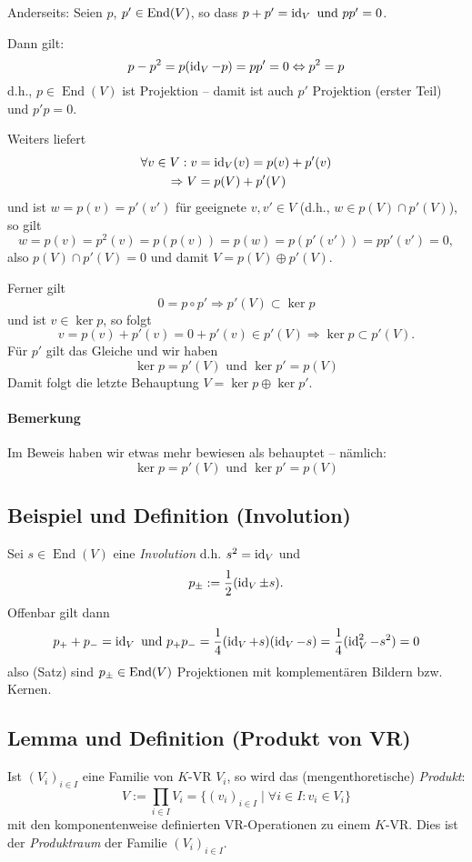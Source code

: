  		Anderseits: Seien $p$, $p'\in \operatorname{End}(V)$, so dass $p+p' = \operatorname{id}_V \text{ und } pp' = 0$.

 		Dann gilt:
 		\[
 			p-p^2 = p(\operatorname{id}_V-p) = pp' = 0 \Leftrightarrow p^2=p
 		\]
 		d.h., $p\in\operatorname{End}(V)$ ist Projektion -- damit ist auch $p'$ Projektion (erster Teil) und $p' p = 0 $.

 		Weiters liefert
 		\begin{align*}
 			\forall v\in V: v & =\operatorname{id}_V(v) = p(v) + p'(v) \\
 			\Rightarrow V     & = p(V)+p'(V)
 		\end{align*}
 		und ist $w = p(v)= p'(v')$ für geeignete $v,v'\in V$ (d.h., $w \in p(V)\cap p'(V)$), so gilt
 		\[
 			w = p(v) = p^2(v) = p(p(v)) = p(w) = p(p'(v')) = pp'(v') = 0,
 		\]
 		also $p(V)\cap p'(V) = {0}$ und damit $V = p(V)\oplus p'(V)$.

 		Ferner gilt
 		\[
 			0 = p \circ p' \Rightarrow p'(V)\subset \ker p
 		\]
 		und ist $v\in \ker p$, so folgt
 		\[
 			v = p(v) + p'(v) = 0 + p'(v)\in p'(V) \Rightarrow \ker p \subset p'(V).
 		\]
 		Für $p'$ gilt das Gleiche und wir haben
 		\[
 			\ker p = p'(V) \text{ und } \ker p' = p(V)
 		\]
 		Damit folgt die letzte Behauptung $V = \ker p \oplus\ker p'$.

 	\paragraph{Bemerkung}
 		Im Beweis haben wir etwas mehr bewiesen als behauptet -- nämlich:
 		\[
 			\ker p = p'(V)\text{ und }\ker p' = p(V)
 		\]

 \subsection{Beispiel und Definition (Involution)}
 	\begin{Definition}[Definition]
 		Sei $s\in \operatorname{End}(V)$ eine \emph{Involution} d.h. $s^2 = \operatorname{id}_V$  und
 		\[
 			p_\pm := \frac{1}{2}(\operatorname{id}_V\pm s).
 		\]
 		Offenbar gilt dann
 		\[
 			p_{+} + p_{-} = \operatorname{id}_V \text{ und } p_+ p_{-} = \frac{1}{4}(\operatorname{id}_V +s)(\operatorname{id}_V -s) =  \frac{1}{4}(\operatorname{id}_V^2-s^2)=0
 		\]
 		also (Satz) sind $p_\pm\in\operatorname{End}(V)$ Projektionen mit komplementären Bildern bzw. Kernen.
 	\end{Definition}

 \subsection{Lemma und Definition (Produkt von VR)}
 	\begin{Definition}
 		Ist $(V_i)_{i\in I}$ eine Familie von $ K $-VR $V_i$, so wird das (mengenthoretische) \emph{Produkt}:
 		\[
 			V:= \prod_{i\in I}V_i=\{(v_i)_{i\in I}\mid\forall i\in I:v_i\in V_i\}
 		\]
 		mit den komponentenweise definierten VR-Operationen zu einem $ K $-VR. Dies ist der \emph{Produktraum} der Familie	$(V_i)_{i\in I}$.
 	\end{Definition}

